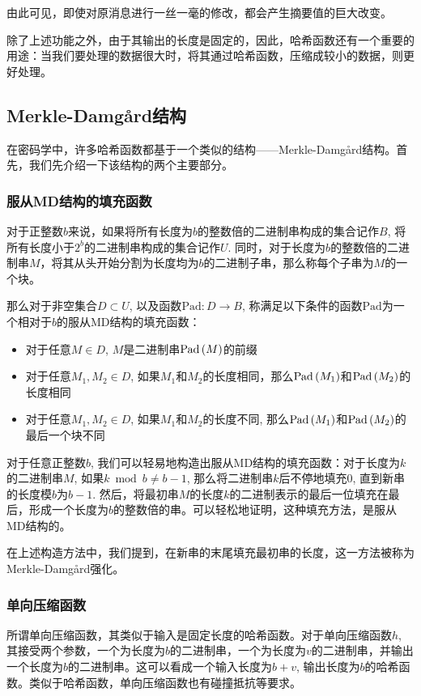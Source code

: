 由此可见，即使对原消息进行一丝一毫的修改，都会产生摘要值的巨大改变。\par
除了上述功能之外，由于其输出的长度是固定的，因此，哈希函数还有一个重要的用途：当我们要处理的数据很大时，将其通过哈希函数，压缩成较小的数据，则更好处理。
\subsection{Merkle-Damg\aa rd结构}
在密码学中，许多哈希函数都基于一个类似的结构——Merkle-Damg\aa rd结构。首先，我们先介绍一下该结构的两个主要部分。
\subsubsection{服从MD结构的填充函数}
对于正整数$b$来说，如果将所有长度为$b$的整数倍的二进制串构成的集合记作$B$, 将所有长度小于$2^b$的二进制串构成的集合记作$U$. 同时，对于长度为$b$的整数倍的二进制串$M$，将其从头开始分割为长度均为$b$的二进制子串，那么称每个子串为$M$的一个块。\par
那么对于非空集合$D\subset U$, 以及函数$\mathrm{Pad}:D\to B$, 称满足以下条件的函数$\mathrm{Pad}$为一个相对于$b$的服从MD结构的填充函数：
\begin{itemize}
	\item 对于任意$M\in D$, $M$是二进制串$\mathrm{Pad}\left( {M}\right)$的前缀
	\item 对于任意$M_1, M_2\in D$, 如果$M_1$和$M_2$的长度相同，那么$\mathrm{Pad}\left( {M_1}\right)$和$\mathrm{Pad}\left( {M_2}\right)$的长度相同
	\item 对于任意$M_1, M_2\in D$, 如果$M_1$和$M_2$的长度不同, 那么$\mathrm{Pad}\left( {M_1}\right)$和$\mathrm{Pad}\left( {M_2}\right)$的最后一个块不同
\end{itemize}

对于任意正整数$b$, 我们可以轻易地构造出服从MD结构的填充函数：对于长度为$k$的二进制串$M$, 如果$k\bmod b\neq b-1$, 那么将二进制串$k$后不停地填充$0$, 直到新串的长度模$b$为$b-1$. 然后，将最初串$M$的长度$k$的二进制表示的最后一位填充在最后，形成一个长度为$b$的整数倍的串。可以轻松地证明，这种填充方法，是服从MD结构的。\par
在上述构造方法中，我们提到，在新串的末尾填充最初串的长度，这一方法被称为Merkle-Damg\aa rd强化。
\subsubsection{单向压缩函数}
所谓单向压缩函数，其类似于输入是固定长度的哈希函数。对于单向压缩函数$h$, 其接受两个参数，一个为长度为$b$的二进制串，一个为长度为$v$的二进制串，并输出一个长度为$b$的二进制串。这可以看成一个输入长度为$b+v$, 输出长度为$b$的哈希函数。类似于哈希函数，单向压缩函数也有碰撞抵抗等要求。
